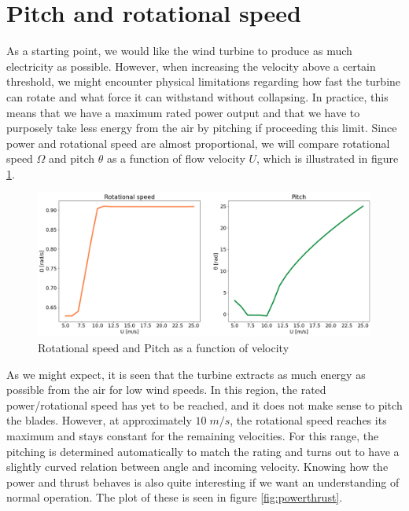 \section{Pitch and rotational speed}

As a starting point, we would like the wind turbine to produce as much electricity as possible. However, when increasing the velocity above a certain threshold, we might encounter physical limitations regarding how fast the turbine can rotate and what force it can withstand without collapsing. In practice, this means that we have a maximum rated power output and that we have to purposely take less energy from the air by pitching if proceeding this limit. Since power and rotational speed are almost proportional, we will compare rotational speed $\Omega$ and pitch $\theta$ as a function of flow velocity $U$, which is illustrated in figure \ref{fig:rotpitch}.

\begin{figure}[H]
    \centering
    \includegraphics[scale=0.3]{Illustrations/rotpitch.png}
    \caption{Rotational speed and Pitch as a function of velocity}
    \label{fig:rotpitch}
\end{figure}

As we might expect, it is seen that the turbine extracts as much energy as possible from the air for low wind speeds. In this region, the rated power/rotational speed has yet to be reached, and it does not make sense to pitch the blades. However, at approximately $10 \; m/s$, the rotational speed reaches its maximum and stays constant for the remaining velocities. For this range, the pitching is determined automatically to match the rating and turns out to have a slightly curved relation between angle and incoming velocity. Knowing how the power and thrust behaves is also quite interesting if we want an understanding of normal operation. The plot of these is seen in figure \ref{fig:powerthrust}.

